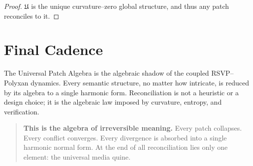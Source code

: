 \begin{proof}
$\mathfrak{U}$ is the unique curvature–zero global structure, and thus any
patch reconciles to it.
\end{proof}

\section{Final Cadence}
\label{sec:80-6}

The Universal Patch Algebra is the algebraic shadow of the coupled
RSVP--Polyxan dynamics.  
Every semantic structure, no matter how intricate, is reduced by its
algebra to a single harmonic form.  
Reconciliation is not a heuristic or a design choice; it is the algebraic
law imposed by curvature, entropy, and verification.

\begin{quote}
\textbf{This is the algebra of irreversible meaning.}  
Every patch collapses.  
Every conflict converges.  
Every divergence is absorbed into a single harmonic normal form.  
At the end of all reconciliation lies only one element: the universal
media quine.
\end{quote}

